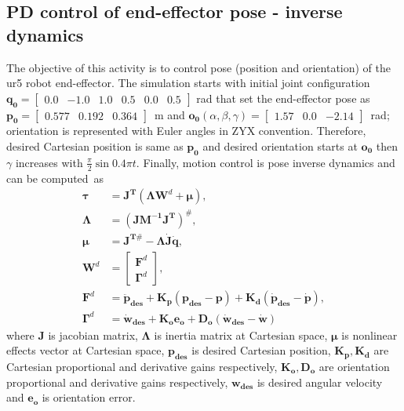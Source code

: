 \graphicspath{{images/act_3.6/}}
\setcounter{subsection}{5}
\subsection{PD control of end-effector pose - inverse dynamics}
The objective of this activity is to control pose (position and orientation) of the ur5 robot end-effector. The simulation starts with initial joint configuration $\mathbf{q_0}=\begin{bmatrix} 0.0 & -1.0 & 1.0 & 0.5 & 0.0 & 0.5 \end{bmatrix}$ rad that set the end-effector pose as $\mathbf{p_0}=\begin{bmatrix}  0.577 &   0.192 &   0.364 \end{bmatrix}$~m and $\mathbf{o_0}(\alpha, \beta, \gamma)= \begin{bmatrix} 1.57 & 0.0 & -2.14 \end{bmatrix}$~rad; orientation is represented with Euler angles in ZYX convention. Therefore, desired Cartesian position is same as $\mathbf{p_0}$ and desired orientation starts at $\mathbf{o_0}$ then $\gamma$ increases with $\frac{\pi}{2}\sin{0.4\pi t}$. Finally, motion control is pose inverse dynamics and can be computed~as 
\begin{align}
	\boldsymbol{\tau} &= \mathbf{J^T} (\boldsymbol{\Lambda}\mathbf{W}^{d} + \boldsymbol{\mu}), \label{eq:pose_idyn}
	\\
	\boldsymbol{\Lambda} &= (\mathbf{J M^{-1} J^{T}})^{\#}, 
	\nonumber \\
	\boldsymbol{\mu} &= \mathbf{J^{T\#}} - \boldsymbol{\Lambda}\mathbf{\dot{J}\dot{q}}, 
	\nonumber \\	
	\mathbf{W}^{d} &=
	\begin{bmatrix}
	\mathbf{F}^{d} \\ \boldsymbol{\Gamma}^{d}
	\end{bmatrix}, 
	\nonumber \\
	\mathbf{F}^{d} &= \mathbf{\ddot{p}_{des}} + \mathbf{K_p (p_{des}-p)} + \mathbf{K_d (\dot{p}_{des}-\dot{p})}, 
	\nonumber \\
	\boldsymbol{\Gamma}^{d} &= \mathbf{\dot{w}_{des}} + \mathbf{K_o e_o} + \mathbf{D_o (\dot{w}_{des}-\dot{w})} \nonumber
\end{align}
\noindent where $\mathbf{J}$ is jacobian matrix, $\boldsymbol{\Lambda}$ is inertia matrix at Cartesian space, $\boldsymbol{\mu}$ is nonlinear effects vector at Cartesian space, $\mathbf{p_{des}}$ is desired Cartesian position, $\mathbf{K_p, K_d}$ are Cartesian proportional and derivative gains respectively, $\mathbf{K_o, D_o}$ are orientation proportional and derivative gains respectively, $\mathbf{w_{des}}$ is desired angular velocity and $\mathbf{e_o}$ is orientation error. \vspace{.5cm}


